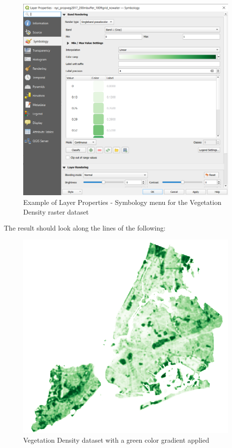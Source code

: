 \documentclass[
  letterpaper,
  DIV=11,
  numbers=noendperiod]{scrreprt}
\begin{document}
\begin{figure}

{\centering \includegraphics{./images/raster_style_greens.png}

}

\caption{Example of Layer Properties - Symbology menu for the Vegetation
Density raster dataset}

\end{figure}

The result should look along the lines of the following:

\begin{figure}

{\centering \includegraphics{./images/vegetation_density_greens.png}

}

\caption{Vegetation Density dataset with a green color gradient applied}

\end{figure}
\end{document}
